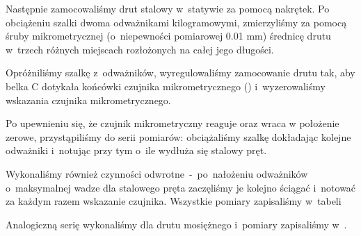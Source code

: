 \documentclass{fizraport}
\begin{document}
Następnie zamocowaliśmy drut stalowy w~statywie za pomocą nakrętek. Po obciążeniu szalki dwoma odważnikami
kilogramowymi, zmierzyliśmy za pomocą śruby mikrometrycznej (o~niepewności pomiarowej 0.01 mm) średnicę drutu w~trzech różnych miejscach rozłożonych na całej jego długości.

Opróżniliśmy szalkę z~odważników, wyregulowaliśmy zamocowanie drutu tak, aby belka C dotykała końcówki czujnika mikrometrycznego () i~wyzerowaliśmy wskazania czujnika mikrometrycznego.

Po upewnieniu się, że czujnik mikrometryczny reaguje oraz wraca w położenie zerowe, przystąpiliśmy do serii pomiarów:
obciążaliśmy szalkę dokładając kolejne odważniki i~notując przy tym o~ile wydłuża się stalowy pręt.

Wykonaliśmy również czynności odwrotne~-~po~nałożeniu odważników o~maksymalnej wadze dla stalowego pręta zaczęliśmy je kolejno ściągać i~notować za każdym razem wskazanie czujnika. Wszystkie pomiary zapisaliśmy w~tabeli 

Analogiczną serię wykonaliśmy dla drutu mosiężnego i~pomiary zapisaliśmy w~.
\end{document}
